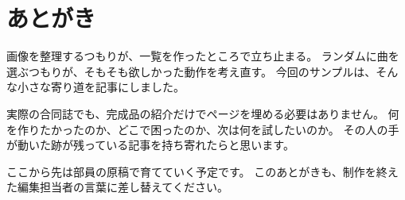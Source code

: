 \chapter{あとがき}
画像を整理するつもりが、一覧を作ったところで立ち止まる。
ランダムに曲を選ぶつもりが、そもそも欲しかった動作を考え直す。
今回のサンプルは、そんな小さな寄り道を記事にしました。

実際の合同誌でも、完成品の紹介だけでページを埋める必要はありません。
何を作りたかったのか、どこで困ったのか、次は何を試したいのか。
その人の手が動いた跡が残っている記事を持ち寄れたらと思います。

ここから先は部員の原稿で育てていく予定です。
このあとがきも、制作を終えた編集担当者の言葉に差し替えてください。
